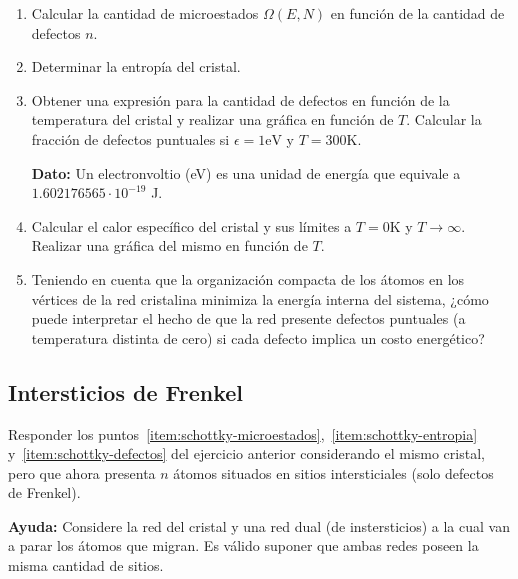 \documentclass[a4paper,11pt]{article}
\begin{document}
\begin{enumerate}[label=(\alph*),
                  leftmargin=2\parindent,
                  rightmargin=2\parindent]

    \item{\label{item:schottky-microestados}
          Calcular la cantidad de microestados $\Omega(E, N)$ en
          función de la cantidad de defectos $n$.
          }

    \item{\label{item:schottky-entropia}
          Determinar la entropía del cristal.}

    \item{\label{item:schottky-defectos}
          Obtener una expresión para la cantidad de defectos en función de la
          temperatura del cristal y realizar una gráfica en función de $T$.
          Calcular la fracción de defectos puntuales si
          $\epsilon = 1 \text{eV}$ y $T = 300 \text{K}$.
          }

    {\small
    \textbf{Dato:}
    Un electronvoltio (eV) es una unidad de energía que equivale a
    $1.602176565 \cdot 10^{-19}$ J.
    }

    \item{\label{item:schottky-cv}
          Calcular el calor específico del cristal y sus límites
          a $T = 0 \text{K}$ y $T \rightarrow \infty$.
          Realizar una gráfica del mismo en función de $T$.
          }

    \item{Teniendo en cuenta que la organización compacta de los átomos
          en los vértices de la red cristalina minimiza la energía
          interna del sistema, ¿cómo puede interpretar el hecho de que
          la red presente defectos puntuales (a temperatura distinta de
          cero) si cada defecto implica un costo energético?
          }

\end{enumerate}


\subsection*{Intersticios de Frenkel}

Responder los puntos~\ref{item:schottky-microestados},~\ref{item:schottky-entropia}
y~\ref{item:schottky-defectos} del ejercicio anterior considerando el mismo cristal,
pero que ahora presenta $n$ átomos situados en sitios intersticiales (solo defectos de
Frenkel).

\vspace{0.5em}
{\small
\textbf{Ayuda:} Considere la red del cristal y una red dual (de
instersticios) a la cual van a parar los átomos que migran. Es válido
suponer que ambas redes poseen la misma cantidad de sitios.
}
\end{document}
